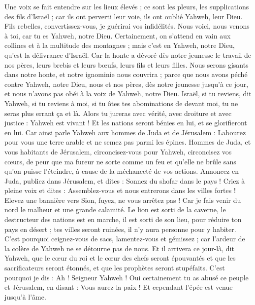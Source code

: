 \begin{multicols}{2}
Une voix se fait entendre sur les lieux élevés ; ce sont les pleurs, les supplications des fils d'Israël ; car ils ont perverti leur voie, ils ont oublié Yahweh, leur Dieu.
Fils rebelles, convertissez-vous, je guérirai vos infidélités. Nous voici, nous venons à toi, car tu es Yahweh, notre Dieu.
Certainement, on s'attend en vain aux collines et à la multitude des montagnes ; mais c'est en Yahweh, notre Dieu, qu'est la délivrance d'Israël.
Car la honte a dévoré dès notre jeunesse le travail de nos pères, leurs brebis et leurs bœufs, leurs fils et leurs filles.
Nous serons gisants dans notre honte, et notre ignominie nous couvrira ; parce que nous avons péché contre Yahweh, notre Dieu, nous et nos pères, dès notre jeunesse jusqu'à ce jour, et nous n'avons pas obéi à la voix de Yahweh, notre Dieu.
\VerseOne{}Israël, si tu reviens, dit Yahweh, si tu reviens à moi, si tu ôtes tes abominations de devant moi, tu ne seras plus errant ça et là.
Alors tu jureras avec vérité, avec droiture et avec justice : Yahweh est vivant ! Et les nations seront bénies en lui, et se glorifieront en lui.
Car ainsi parle Yahweh aux hommes de Juda et de Jérusalem : Labourez pour vous une terre arable et ne semez pas parmi les épines.
Hommes de Juda, et vous habitants de Jérusalem, circoncisez-vous pour Yahweh, circoncisez vos cœurs, de peur que ma fureur ne sorte comme un feu et qu'elle ne brûle sans qu'on puisse l'éteindre, à cause de la méchanceté de vos actions.
Annoncez en Juda, publiez dans Jérusalem, et dites : Sonnez du shofar dans le pays ! Criez à pleine voix et dites : Assemblez-vous et nous entrerons dans les villes fortes !
Elevez une bannière vers Sion, fuyez, ne vous arrêtez pas ! Car je fais venir du nord le malheur et une grande calamité.
Le lion est sorti de la caverne, le destructeur des nations est en marche, il est sorti de son lieu, pour réduire ton pays en désert ; tes villes seront ruinées, il n'y aura personne pour y habiter.
C'est pourquoi ceignez-vous de sacs, lamentez-vous et gémissez ; car l'ardeur de la colère de Yahweh ne se détourne pas de nous.
Et il arrivera ce jour-là, dit Yahweh, que le cœur du roi et le cœur des chefs seront épouvantés et que les sacrificateurs seront étonnés, et que les prophètes seront stupéfaits.
C'est pourquoi je dis : Ah ! Seigneur Yahweh ! Oui certainement tu as abusé ce peuple et Jérusalem, en disant : Vous aurez la paix ! Et cependant l'épée est venue jusqu'à l'âme.

\end{multicols}
